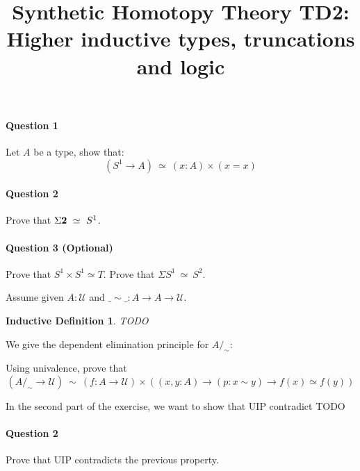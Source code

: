 \documentclass{article}[6pt]%
\title{Synthetic Homotopy Theory TD2: Higher inductive types, truncations and logic}
\newcommand{\U}{{\mathcal U}}
\renewcommand{\r}{\rightarrow}
\newcommand{\two}{{\bf 2}}
\newtheorem{ind_def}{Inductive Definition}
\begin{document}
\maketitle

\begin{Exercise}[title={Higher inductive types}]

\paragraph{Question 1} Let $A$ be a type, show that: 
\[(S^1\r A)\ \simeq\ (x:A)\times (x=x)\]

\paragraph{Question 2} Prove that $\Sigma \two \ \simeq \ S^1$. 

\paragraph{Question 3 (Optional)} Prove that $S^1\times S^1 \simeq T$. Prove that $\Sigma S^1 \ \simeq \ S^2$.
\end{Exercise}


\begin{Exercise}[title={Quotients},difficulty=1]
Assume given $A:\U$ and $\_\sim\_:A\r A\r \U$.

\begin{ind_def}
TODO
\end{ind_def}

We give the dependent elimination principle for $A/_\sim$:

 Using univalence, prove that 
\[(A/_\sim \r \U)\ \sim\ (f:A\r \U)\times( (x,y:A)\r (p:x\sim y) \r f(x)\simeq f(y))\]

\vspace{0.6cm}

In the second part of the exercise, we want to show that UIP contradict TODO

\paragraph{Question 2} Prove that UIP contradicts the previous property. 
\end{Exercise}
\end{document}
